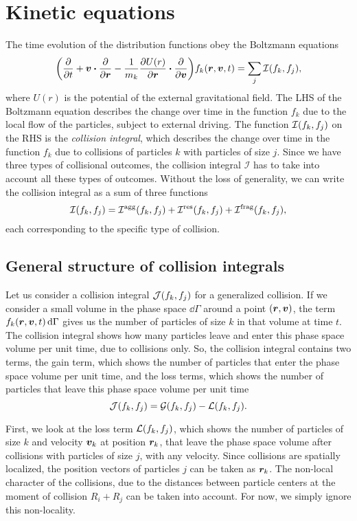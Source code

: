 \documentclass[aps,prl,preprint,groupedaddress,10pt]{revtex4-2}
\begin{document}
\section{Kinetic equations}
The time evolution of the distribution functions obey the Boltzmann equations
\begin{equation}
    \pqty{\pdv{t}+\bv\vdot\pdv{\br}-\frac{1}{m_k}\pdv{U(r)}{\br}\vdot\pdv{\bv}}
    f_k\pqty{\br,\bv,t}=\sum_{j}\mathcal{I}\pqty{f_k,f_j},
\end{equation}
where $U(r)$ is the potential of the external gravitational field. The LHS
of the Boltzmann equation describes the change over time in the function $f_k$ due to the
local flow of the particles, subject to external driving. The function 
$\mathcal{I}\pqty{f_k,f_j}$ on the RHS is the \emph{collision integral}, which 
describes the change over time in the function $f_k$ due to collisions of particles $k$
with particles of size $j$. Since we have three types of collisional outcomes, the 
collision integral $\mathcal{I}$ has to take into account all these types of outcomes.
Without the loss of generality, we can write the collision integral as a sum of three 
functions
\begin{equation}
    \mathcal{I}\pqty{f_k,f_j}=\utx{\mathcal{I}}{agg}\pqty{f_k,f_j}+
    \utx{\mathcal{I}}{res}\pqty{f_k,f_j}+\utx{\mathcal{I}}{frag}\pqty{f_k,f_j},
\end{equation}
each corresponding to the specific type of collision.

\subsection{General structure of collision integrals}
Let us consider a collision integral $\mathcal{J}\pqty{f_k,f_j}$ for a generalized 
collision. If we consider a small volume in the phase space $\dd{\Gamma}$ 
around a point $\pqty{\br,\bv}$, the term $f_k\pqty{\br,\bv,t}\dd{\Gamma}$ gives us 
the number of particles of size $k$ in that volume at time $t$. The collision integral
shows how many particles leave and enter this phase space volume per unit time, due 
to collisions only. So, the collision integral contains two terms, the gain term, which
shows the number of particles that enter the phase space volume per unit time, and the 
loss terms, which shows the number of particles that leave this phase space volume per 
unit time
\begin{equation}
    \mathcal{J}\pqty{f_k,f_j}=\mathcal{G}\pqty{f_k,f_j}-\mathcal{L}\pqty{f_k,f_j}.
\end{equation}

First, we look at the loss term $\mathcal{L}\pqty{f_k,f_j}$, which shows the number of 
particles of size $k$ and velocity $\vb*{v}_k$ at position $\vb*{r}_k$, that leave the phase 
space volume after collisions with particles of size $j$, with any velocity. Since 
collisions are spatially localized, the position vectors of particles $j$ can be taken as 
$\vb*{r}_k$. The non-local character of the collisions, due to the distances between particle 
centers at the moment of collision $R_i+R_j$ can be taken into account. For now, we simply
ignore this non-locality.


    
\end{document}
